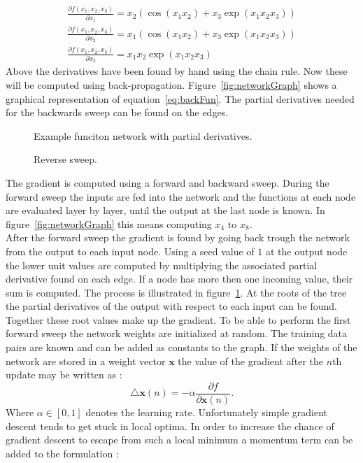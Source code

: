 \begin{align}
\frac{\partial f(x_1,x_2,x_3)}{\partial x_1} = x_2 (\cos(x_1 x_2) + x_3 \exp(x_1 x_2 x_3)) \\
\frac{\partial f(x_1,x_2,x_3)}{\partial x_2} = x_1 (\cos(x_1 x_2) + x_3 \exp(x_1 x_2 x_3)) \\
\frac{\partial f(x_1,x_2,x_3)}{\partial x_3} = x_1  x_2 \exp(x_1 x_2 x_3)
\end{align} 
Above the derivatives have been found by hand using the chain rule. Now these will be computed using back-propagation. Figure~\ref{fig:networkGraph} shows a graphical representation of equation~\ref{eq:backFun}. The partial derivatives needed for the backwards sweep can be found on the edges. \\
\begin{figure}
\centering

\caption{Example funciton network with partial derivatives.}
\label{fig:networkGraph}

\caption{Reverse sweep.}
\label{fig:reverseSweep}
\end{figure}
The gradient is computed using a forward and backward sweep. During the forward sweep the inputs are fed into the network and the functions at each node are evaluated layer by layer, until the output at the last node is known. In figure~\ref{fig:networkGraph} this means computing $x_4$ to $x_8$. \\
After the forward sweep the gradient is found by going back trough the network from the output to each input node. Using a seed value of $1$ at the output node the lower unit values are computed by multiplying the associated partial derivative found on each edge. If a node has more then one incoming value, their sum is computed. The process is illustrated in figure~\ref{fig:reverseSweep}. At the roots of the tree the partial derivatives of the output with respect to each input can be found. Together these root values make up the gradient. 
To be able to perform the first forward sweep the network weights are initialized at random. The training data pairs are known and can be added as constants to the graph. 
If the weights of the network are stored in a weight vector $\mathbf{x}$ the value of the gradient after the $n$th update may be written as \cite[page 27]{Graves2008}:
\begin{equation}
\triangle \mathbf{x}(n) = -\alpha \frac{\partial f}{\partial \mathbf{x}(n)}.
\end{equation}
Where $\alpha \in [0,1]$ denotes the learning rate. Unfortunately simple gradient descent tends to get stuck in local optima. In order to increase the chance of gradient descent to escape from such a local minimum a momentum term can be added to the formulation \cite[page 267]{Bishop1995}\cite[page 27]{Graves2008}:
